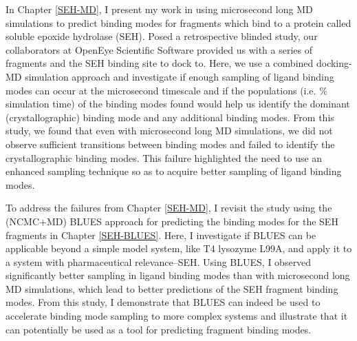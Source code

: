 In Chapter \ref{SEH-MD}, I present my work in using microsecond long MD simulations to predict binding modes for fragments which bind to a protein called soluble epoxide hydrolase (SEH).
Posed a retrospective blinded study, our collaborators at OpenEye Scientific Software provided us with a series of fragments and the SEH binding site to dock to.
Here, we use a combined docking-MD simulation approach and investigate if enough sampling of ligand binding modes can occur at the microsecond timescale and if the populations (i.e. \% simulation time) of the binding modes found would help us identify the dominant (crystallographic) binding mode and any additional binding modes. 
From this study, we found that even with microsecond long MD simulations, we did not observe sufficient transitions between binding modes and failed to identify the crystallographic binding modes.
This failure highlighted the need to use an enhanced sampling technique so as to acquire better sampling of ligand binding modes.

To address the failures from Chapter \ref{SEH-MD}, I revisit the study using the (NCMC+MD) BLUES approach for predicting the binding modes for the SEH fragments in Chapter \ref{SEH-BLUES}.
Here, I investigate if BLUES can be applicable beyond a simple model system, like T4 lysozyme L99A, and apply it to a system with pharmaceutical relevance--SEH.
Using BLUES, I observed significantly better sampling in ligand binding modes than with microsecond long MD simulations, which lead to better predictions of the SEH fragment binding modes.
From this study, I demonstrate that BLUES can indeed be used to accelerate binding mode sampling to more complex systems and illustrate that it can potentially be used as a tool for predicting fragment binding modes.


